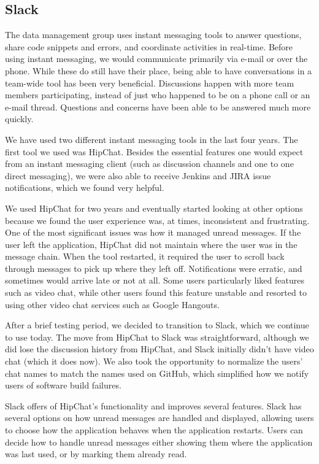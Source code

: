 \subsection{Slack}

The data management group uses instant messaging tools to answer questions, 
share code snippets and errors, and coordinate activities in real-time.  
Before using instant messaging, we would communicate primarily via e-mail or 
over the phone. While these do still have their place, being able to have 
conversations in a team-wide tool has been very beneficial. Discussions happen 
with more team members participating, instead of just who happened to be on a 
phone call or an e-mail thread. Questions and concerns have been able to be 
answered much more quickly.

We have used two different instant messaging tools in the last four years. The
first tool we used was HipChat. Besides the essential features one would
expect from an instant messaging client (such as discussion channels and one
to one direct messaging), we were also able to receive Jenkins and JIRA issue
notifications, which we found very helpful.

We used HipChat for two years and eventually started looking at other options 
because we found the user experience was, at times, inconsistent and 
frustrating. One of the most significant issues was how it managed unread
messages. If the user left the application, HipChat did not maintain where the
user was in the message chain. When the tool restarted, it required the user
to scroll back through messages to pick up where they left off. Notifications
were erratic, and sometimes would arrive late or not at all. Some users
particularly liked features such as video chat, while other users found this
feature unstable and resorted to using other video chat services such as Google 
Hangouts. 

After a brief testing period, we decided to transition to Slack, which we
continue to use today. The move from HipChat to Slack was straightforward,
although we did lose the discussion history from HipChat, and Slack initially
didn't have video chat (which it does now). We also took the opportunity to
normalize the users' chat names to match the names used on GitHub, which
simplified how we notify users of software build failures.

Slack offers of HipChat's functionality and improves several features. Slack 
has several options on how unread messages are handled and displayed, allowing
users to choose how the application behaves when the application restarts. 
Users can decide how to handle unread messages either showing them where the
application was last used, or by marking them already read.

